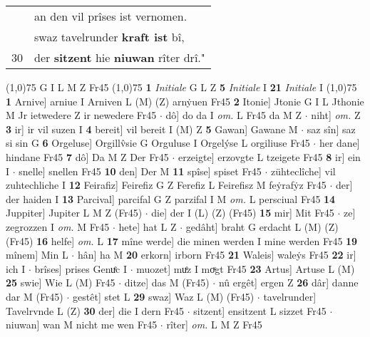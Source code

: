 \documentclass[8pt,a4paper,notitlepage]{article}
\begin{document}
\begin{table}[ht]
\begin{minipage}[t]{0.5\linewidth}
\begin{tabular}{rl}
 & an den vil prîses ist vernomen.\\ 
 & swaz tavelrunder \textbf{kraft ist} bî,\\ 
30 & der \textbf{sitzent} hie \textbf{niuwan} rîter drî."\\ 
\end{tabular}
\scriptsize
\line(1,0){75} \newline
G I L M Z Fr45 \newline
\line(1,0){75} \newline
\textbf{1} \textit{Initiale} G L Z  \textbf{5} \textit{Initiale} I  \textbf{21} \textit{Initiale} I  \newline
\line(1,0){75} \newline
\textbf{1} Arnive] arniue I Arniven L (M) (Z) arnẏuen Fr45 \textbf{2} Itonie] Jtonie G I L Jthonie M Jr ietwedere Z ir newedere Fr45  $\cdot$ dô] do da I \textit{om.} L Fr45 da M Z  $\cdot$ niht] \textit{om.} Z \textbf{3} ir] ir vil suzen I \textbf{4} bereit] vil bereit I (M) Z \textbf{5} Gawan] Gawane M  $\cdot$ saz sîn] saz si sin G \textbf{6} Orgeluse] Orgillv̂sie G Orguluse I Orgelýse L orgiliuse Fr45  $\cdot$ her dane] hindane Fr45 \textbf{7} dô] Da M Z Der Fr45  $\cdot$ erzeigte] erzovgte L tzeigete Fr45 \textbf{8} ir] ein I  $\cdot$ snelle] snellen Fr45 \textbf{10} den] Der M \textbf{11} spîse] spiset Fr45  $\cdot$ zühteclîche] vil zuhtechliche I \textbf{12} Feirafiz] Feirefiz G Z Ferefiz L Feirefisz M feẏrafẏz Fr45  $\cdot$ der] der haiden I \textbf{13} Parcival] parcifal G Z parzifal I M \textit{om.} L persciual Fr45 \textbf{14} Juppiter] Jupiter L M Z (Fr45)  $\cdot$ die] der I (L) (Z) (Fr45) \textbf{15} mir] Mit Fr45  $\cdot$ ze] zegrozzen I \textit{om.} M Fr45  $\cdot$ hete] hat L Z  $\cdot$ gedâht] braht G erdacht L (M) (Z) (Fr45) \textbf{16} helfe] \textit{om.} L \textbf{17} mîne werde] die minen werden I mine werden Fr45 \textbf{19} mînem] Min L  $\cdot$ hân] ha M \textbf{20} erkorn] irborn Fr45 \textbf{21} Waleis] waleẏs Fr45 \textbf{22} ir] ich I  $\cdot$ brîses] prises Genuͤc I  $\cdot$ muozet] muͤz I moͮgt Fr45 \textbf{23} Artus] Artuse L (M) \textbf{25} swie] Wie L (M) Fr45  $\cdot$ ditze] das M (Fr45)  $\cdot$ nû ergêt] ergen Z \textbf{26} dâr] danne dar M (Fr45)  $\cdot$ gestêt] stet L \textbf{29} swaz] Waz L (M) (Fr45)  $\cdot$ tavelrunder] Tavelrvnde L (Z) \textbf{30} der] die I dern Fr45  $\cdot$ sitzent] ensitzent L sizzet Fr45  $\cdot$ niuwan] wan M nicht me wen Fr45  $\cdot$ rîter] \textit{om.} L M Z Fr45 \newline
\end{minipage}

\end{table}
\end{document}
